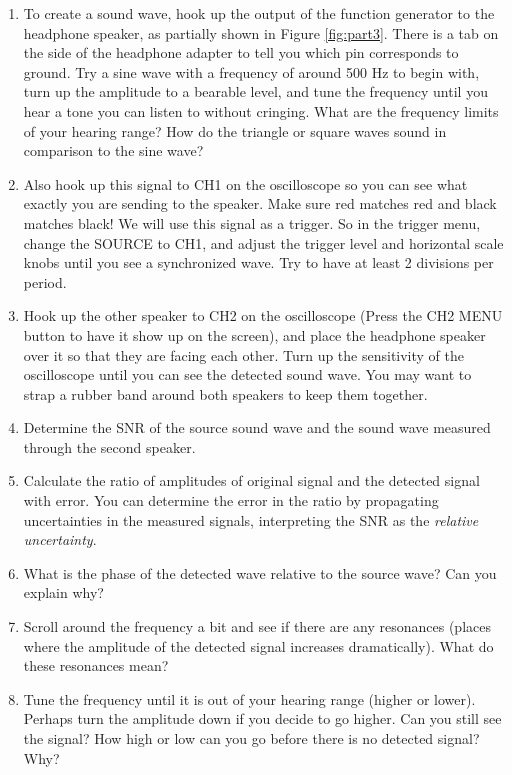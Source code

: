 \begin{enumerate}
\item To create a sound wave, hook up the output of the function generator to the headphone speaker, as partially shown in Figure \ref{fig:part3}. There is a tab on the side of the headphone adapter to tell you which pin corresponds to ground. Try a sine wave with a frequency of around 500 Hz to begin with, turn up the amplitude to a bearable level, and tune the frequency until you hear a tone you can listen to without cringing. What are the frequency limits of your hearing range? How do the triangle or square waves sound in comparison to the sine wave?

\item Also hook up this signal to CH1 on the oscilloscope so you can see what exactly you are sending to the speaker. Make sure red matches red and black matches black! We will use this signal as a trigger. So in the trigger menu, change the SOURCE to CH1, and adjust the trigger level and horizontal scale knobs until you see a synchronized wave. Try to have at least 2 divisions per period.

\item Hook up the other speaker to CH2 on the oscilloscope (Press the CH2 MENU button to have it show up on the screen), and place the headphone speaker over it so that they are facing each other. Turn up the sensitivity of the oscilloscope until you can see the detected sound wave.  You may want to strap a rubber band around both speakers to keep them together.

\item Determine the SNR of the source sound wave and the sound wave measured through the second speaker.

\item Calculate the ratio of amplitudes of original signal and the detected signal with error. You can determine the error in the ratio by propagating uncertainties in the measured signals, interpreting the SNR as the {\it{relative uncertainty}}.

\item What is the phase of the detected wave relative to the source wave? Can you explain why?

\item Scroll around the frequency a bit and see if there are any resonances (places where the amplitude of the detected signal increases dramatically). What do these resonances mean?

\item Tune the frequency until it is out of your hearing range (higher or lower). Perhaps turn the amplitude down if you decide to go higher. Can you still see the signal? How high or low can you go before there is no detected signal? Why?

\end{enumerate}

